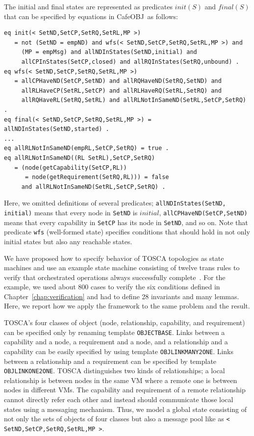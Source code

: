\documentclass[12pt]{report}
\newcommand{\stt}[1]{{\small{\tt {#1}}}}
\newcommand{\cafeobj}{{\sf CafeOBJ}~}
\begin{document}
The initial and final states are represented as predicates $init(S)$
and $final(S)$ that can be specified by equations in \cafeobj as
follows:
\small
\begin{verbatim}
eq init(< SetND,SetCP,SetRQ,SetRL,MP >)
   = not (SetND = empND) and wfs(< SetND,SetCP,SetRQ,SetRL,MP >) and 
     (MP = empMsg) and allNDInStates(SetND,initial) and 
     allCPInStates(SetCP,closed) and allRQInStates(SetRQ,unbound) .
eq wfs(< SetND,SetCP,SetRQ,SetRL,MP >) 
   = allCPHaveND(SetCP,SetND) and allRQHaveND(SetRQ,SetND) and 
     allRLHaveCP(SetRL,SetCP) and allRLHaveRQ(SetRL,SetRQ) and 
     allRQHaveRL(SetRQ,SetRL) and allRLNotInSameND(SetRL,SetCP,SetRQ) .
eq final(< SetND,SetCP,SetRQ,SetRL,MP >) = allNDInStates(SetND,started) .
...
eq allRLNotInSameND(empRL,SetCP,SetRQ) = true .
eq allRLNotInSameND((RL SetRL),SetCP,SetRQ)
   = (node(getCapability(SetCP,RL)) 
      = node(getRequirement(SetRQ,RL))) = false
     and allRLNotInSameND(SetRL,SetCP,SetRQ) .
\end{verbatim}
\normalsize
Here, we omitted definitions of several predicates;
\stt{allNDInStates(SetND,} \stt{initial)} means that every node in
{\tt SetND} is $initial$, \stt{allCPHaveND(SetCP,SetND)} means that
every capability in {\tt SetCP} has its node in {\tt SetND}, and so on.  Note
that predicate {\tt wfs} (well-formed state) specifies conditions that
should hold in not only initial states but also any reachable states.


We have proposed how to specify behavior of TOSCA topologies as state
machines and use an example state machine consisting of twelve trans
rules to verify that orchestrated operations always successfully
complete~\cite{DBLP:conf/icfem/YoshidaOF15}. For the example, we used
about 800 cases to verify the six conditions defined in
Chapter~\ref{chap:verification} and had to define 28 invariants and
many lemmas.  Here, we report how we apply the framework to the same
problem and the result.

TOSCA's four classes of object (node, relationship, capability, and
requirement) can be specified only by renaming template
{\tt OBJECTBASE}.  Links between a capability and a node, a
requirement and a node, and a relationship and a capability can be
easily specified by using template {\tt OBJLINKMANY2ONE}. Links
between a relationship and a requirement can be specified by template
{\tt OBJLINKONE2ONE}.  TOSCA distinguishes two kinds of relationships;
a local relationship is between nodes in the same VM where a remote
one is between nodes in different VMs. The capability and requirement
of a remote relationship cannot directly refer each other and instead
should communicate those local states using a messaging
mechanism. Thus, we model a global state consisting of not only the
sets of objects of four classes but also a message pool like as \stt{<
  SetND,SetCP,SetRQ,SetRL,MP >}.
\end{document}
